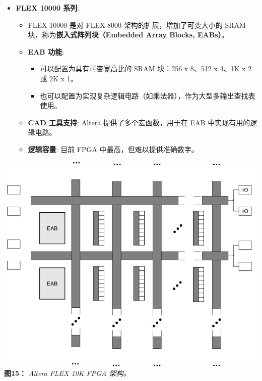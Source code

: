 \begin{frame}
\begin{itemize}
\tightlist
\item
    \textbf{FLEX 10000 系列}:

    \begin{itemize}
    \tightlist
    \item
    FLEX 10000 是对 FLEX 8000 架构的扩展，增加了可变大小的 SRAM
    块，称为\textbf{嵌入式阵列块（Embedded Array Blocks, EABs）}。
    \item
    \textbf{EAB 功能}:

    \begin{itemize}
    \tightlist
    \item
        可以配置为具有可变宽高比的 SRAM 块：256 x 8、512 x 4、1K x 2 或 2K
        x 1。
    \item
        也可以配置为实现复杂逻辑电路（如乘法器），作为大型多输出查找表使用。
    \end{itemize}
    \item
    \textbf{CAD 工具支持}: Altera 提供了多个宏函数，用于在 EAB
    中实现有用的逻辑电路。
    \item
    \textbf{逻辑容量}: 目前 FPGA 中最高，但难以提供准确数字。
    \end{itemize}
\end{itemize}

\includegraphics[keepaspectratio]{img1/FLEX10K.jpeg}
\textbf{图15：} \emph{Altera FLEX 10K FPGA 架构。}
\end{frame}

